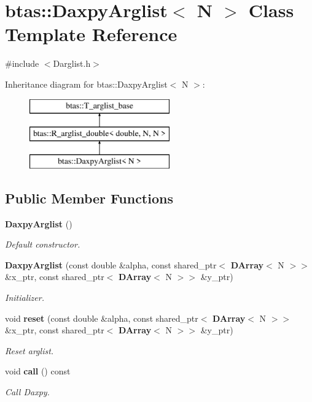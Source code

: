 \section{btas\-:\-:Daxpy\-Arglist$<$ N $>$ Class Template Reference}
\label{d3/d12/classbtas_1_1DaxpyArglist}


{\ttfamily \#include $<$Darglist.\-h$>$}

Inheritance diagram for btas\-:\-:Daxpy\-Arglist$<$ N $>$\-:\begin{figure}[H]
\begin{center}
\leavevmode
\includegraphics[height=3.000000cm]{d3/d12/classbtas_1_1DaxpyArglist}
\end{center}
\end{figure}
\subsection*{Public Member Functions}
\begin{DoxyCompactItemize}
\item 
{\bf Daxpy\-Arglist} ()
\begin{DoxyCompactList}\small\item\em Default constructor. \end{DoxyCompactList}\item 
{\bf Daxpy\-Arglist} (const double \&alpha, const shared\-\_\-ptr$<$ {\bf D\-Array}$<$ N $>$$>$ \&x\-\_\-ptr, const shared\-\_\-ptr$<$ {\bf D\-Array}$<$ N $>$$>$ \&y\-\_\-ptr)
\begin{DoxyCompactList}\small\item\em Initializer. \end{DoxyCompactList}\item 
void {\bf reset} (const double \&alpha, const shared\-\_\-ptr$<$ {\bf D\-Array}$<$ N $>$$>$ \&x\-\_\-ptr, const shared\-\_\-ptr$<$ {\bf D\-Array}$<$ N $>$$>$ \&y\-\_\-ptr)
\begin{DoxyCompactList}\small\item\em Reset arglist. \end{DoxyCompactList}\item 
void {\bf call} () const 
\begin{DoxyCompactList}\small\item\em Call Daxpy. \end{DoxyCompactList}\end{DoxyCompactItemize}
